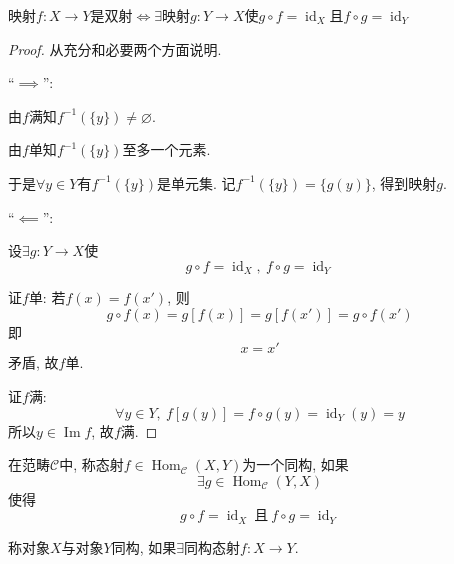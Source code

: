 \begin{theorem}
    映射$f\colon X\to Y$是双射$\iff$$\exists \text{映射}g\colon Y\to X \text{使}g\circ f =\operatorname{id}_X \text{且} f\circ g = \operatorname{id}_Y$
\end{theorem}
\begin{proof}从充分和必要两个方面说明.

    ``$\implies$'':

    由$f$满知$f^{-1}(\{y\})\neq  \varnothing$.

    由$f$单知$f^{-1}(\{y\})$至多一个元素.

    于是$\forall y\in Y$有$f^{-1}(\{y\})$是单元集. 记$f^{-1}(\{y\}) = \{g(y)\}$, 得到映射$g$.

    ``$\impliedby$'':
    
    设$\exists g\colon Y\to X$使
    \begin{equation}
      g\circ f = \operatorname{id}_X, 
      \ f\circ g= \operatorname{id}_Y
    \end{equation}

    证$f$单:
    若$f(x) = f(x')$, 则
    \begin{equation}
      g\circ f(x) = g[f(x)] = g[f(x')] = g\circ f(x')
    \end{equation}
    即
    \begin{equation}
      x=x'
    \end{equation}
    矛盾, 故$f$单.

    证$f$满:
    \begin{equation}
      \forall y\in Y, \ f[g(y)] = f\circ g(y) = \operatorname{id}_Y (y) = y
    \end{equation}
    所以$y\in \operatorname{Im} f$, 故$f$满.

\end{proof}


\begin{definition}
    在范畴$\mathcal{C}$中, 称态射$f \in \operatorname{Hom}_{\mathcal{C}}(X,Y)$为一个同构, 如果
    \begin{equation}
      \exists g \in \operatorname{Hom}_{\mathcal{C}}(Y,X)
    \end{equation}
    使得
    \begin{equation}\label{isomorphism condition}
      g \circ f = \operatorname{id}_{X} \ \text{且} \ 
      f \circ g =\operatorname{id}_{Y}
    \end{equation}

    称对象$X$与对象$Y$同构, 如果$\exists \text{同构态射}f \colon X\to Y$.
\end{definition}

